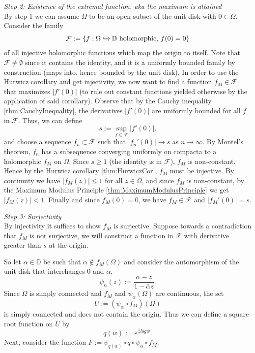 \textit{Step 2: Existence of the extremal function, aka the maximum is attained} \\
By step 1 we can assume $\Omega$ to be an open subset of the unit disk with $0\in\Omega$.
Consider the family $$\mathcal{F}:= \{ f: \Omega \xhookrightarrow{} \mathbb{D} \text{ holomorphic, } f(0) = 0\}$$ of all injective holomorphic functions which map the origin to itself.
Note that $\mathcal{F}\neq\emptyset$ since it contains the identity, and it is a uniformly bounded family by construction (maps into, hence bounded by  the unit disk). 
In order to use the Hurwicz corollary and get injectivity, we now want to find a function $f_{M} \in \mathcal{F}$ that maximizes $|f'(0)|$ (to rule out constant functions yielded otherwise by the application of said corollary).
Observe that by the Cauchy inequality \ref{thm:CauchyInequality}, the derivatives $|f'(0)|$ are uniformly bounded for all $f$ in $\mathcal{F}$.
Thus, we can define $$s:= \displaystyle \sup_{f\in\mathcal{F}} |f'(0)|.$$ and choose a sequence {$f_n$}$\subset\mathcal{F}$ such that $|f_n'(0)| \to s$ as $n\to\infty$.
By Montel's theorem, {$f_n$} has a subsequence converging uniformly on compacta to a holomorphic $f_{M}$ on $\Omega$.
Since $s\geq 1$ (the identity is in $\mathcal{F}$), $f_{M}$ is non-constant. Hence by the Hurwicz corollary \ref{thm:HurwiczCor}, $f_{M}$ must be injective.
By continuity we have $|f_{M}(z)| \leq 1$ for all $z\in\Omega$, and since $f_{M}$ is non-constant, by the Maximum Modulus Principle \ref{thm:MaximumModulusPrinciple} we get $|f_{M}(z)|<1$.
Finally and since $f_{M}(0) = 0$, we have $f_{M}\in\mathcal{F}$ and $|f_{M}'(0)| = s$.
\bigskip

\textit{Step 3: Surjectivity} \\
By injectivity it suffices to show $f_{M}$ is surjective.
Suppose towards a contradiction that $f_{M}$ is not surjective, we will construct a function in $\mathcal{F}$ with derivative greater than $s$ at the origin.

So let $\alpha\in\mathbb{D}$ be such that $\alpha\notin f_{M}(\Omega)$ and consider the automorphism of the unit disk that interchanges 0 and $\alpha$,
$$\psi_{\alpha}(z) := \frac{\alpha-z}{1-\bar{\alpha}z}.$$
Since $\Omega$ is simply connected and $f_{M}$ and $\psi_{\alpha}(\Omega)$ are continuous, the set $$U:= (\psi_{\alpha}\circ f_{M})(\Omega)$$ is simply connected and does not contain the origin.
Thus we can define a square root function on $U$ by $$ q(w):=e^{\frac{1}{2}log w}.$$
Next, consider the function $F:=\psi_{q(\alpha)}\circ q \circ \psi_{\alpha}\circ f_{M}.$


